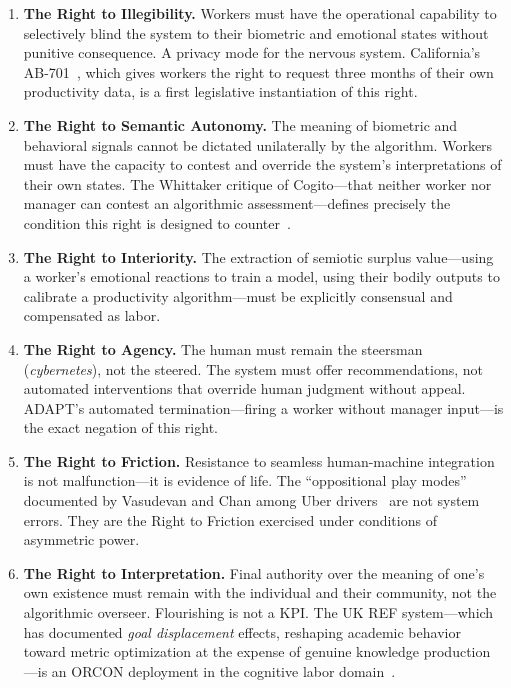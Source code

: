 \documentclass[runningheads]{llncs}
\begin{document}
\begin{enumerate}

\item \textbf{The Right to Illegibility.} Workers must have the operational
capability to selectively blind the system to their biometric and emotional
states without punitive consequence. A privacy mode for the nervous system.
California's AB-701~\cite{ab701california2022}, which gives workers the right
to request three months of their own productivity data, is a first legislative
instantiation of this right.

\item \textbf{The Right to Semantic Autonomy.} The meaning of biometric and
behavioral signals cannot be dictated unilaterally by the algorithm. Workers
must have the capacity to contest and override the system's interpretations of
their own states. The Whittaker critique of Cogito---that neither worker nor
manager can contest an algorithmic assessment---defines precisely the condition
this right is designed to counter~\cite{timecogito2019}.

\item \textbf{The Right to Interiority.} The extraction of semiotic surplus
value---using a worker's emotional reactions to train a model, using their
bodily outputs to calibrate a productivity algorithm---must be explicitly
consensual and compensated as labor.

\item \textbf{The Right to Agency.} The human must remain the steersman
(\emph{cybernetes}), not the steered. The system must offer recommendations,
not automated interventions that override human judgment without appeal. ADAPT's
automated termination---firing a worker without manager input---is the exact
negation of this right.

\item \textbf{The Right to Friction.} Resistance to seamless human-machine
integration is not malfunction---it is evidence of life. The ``oppositional play
modes'' documented by Vasudevan and Chan among Uber
drivers~\cite{vasudevan2022gamification} are not system errors. They are the
Right to Friction exercised under conditions of asymmetric power.

\item \textbf{The Right to Interpretation.} Final authority over the meaning of
one's own existence must remain with the individual and their community, not
the algorithmic overseer. Flourishing is not a KPI. The UK REF system---which
has documented \emph{goal displacement} effects, reshaping academic behavior
toward metric optimization at the expense of genuine knowledge production---is
an ORCON deployment in the cognitive labor domain~\cite{ref2024metrics}.

\end{enumerate}
\end{document}
